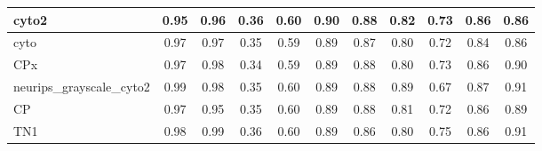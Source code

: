 \documentclass[./dissertation.tex]{subfiles}
\begin{document}
\begin{table}[!ht]
\begin{tabular}{|l|c|c|c|c|c|c|c|c|c|c|}
    cyto2                     & 0.95                                 & 0.96                                  & 0.36                                   & 0.60                                    & 0.90                                   & 0.88                                     & 0.82                                    & 0.73                                    & 0.86                                   & 0.86                                  \\ \hline
    cyto                      & 0.97                                 & 0.97                                  & 0.35                                   & 0.59                                    & 0.89                                   & 0.87                                     & 0.80                                    & 0.72                                    & 0.84                                   & 0.86                                  \\ \hline
    CPx                       & 0.97                                 & 0.98                                  & 0.34                                   & 0.59                                    & 0.89                                   & 0.88                                     & 0.80                                    & 0.73                                    & 0.86                                   & 0.90                                  \\ \hline
    neurips\_grayscale\_cyto2 & 0.99                                 & 0.98                                  & 0.35                                   & 0.60                                    & 0.89                                   & 0.88                                     & 0.89                                    & 0.67                                    & 0.87                                   & 0.91                                  \\ \hline
    CP                        & 0.97                                 & 0.95                                  & 0.35                                   & 0.60                                    & 0.89                                   & 0.88                                     & 0.81                                    & 0.72                                    & 0.86                                   & 0.89                                  \\ \hline
    TN1                       & 0.98                                 & 0.99                                  & 0.36                                   & 0.60                                    & 0.89                                   & 0.86                                     & 0.80                                    & 0.75                                    & 0.86                                   & 0.91                                  \\ \hline

\end{tabular}
\end{table}
\end{document}
